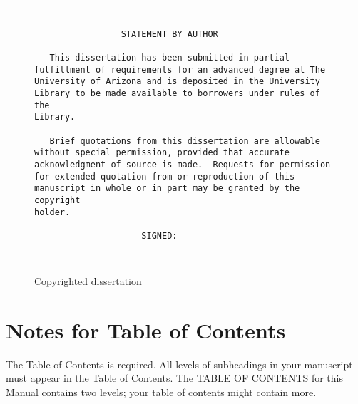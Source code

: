 \documentclass[draft]{ua-thesis}
\begin{document}
\begin{figure}
\hrule
\begin{verbatim}

                 STATEMENT BY AUTHOR

   This dissertation has been submitted in partial
fulfillment of requirements for an advanced degree at The
University of Arizona and is deposited in the University
Library to be made available to borrowers under rules of the
Library.

   Brief quotations from this dissertation are allowable
without special permission, provided that accurate
acknowledgment of source is made.  Requests for permission
for extended quotation from or reproduction of this
manuscript in whole or in part may be granted by the copyright
holder.

                     SIGNED: ________________________________

\end{verbatim}
\hrule
\caption{Copyrighted dissertation}\label{f5}
\end{figure}


\section{Notes for Table of Contents}

The Table of Contents is required. All levels of subheadings in your
manuscript must appear in the Table of Contents. The TABLE OF CONTENTS for
this Manual contains two levels; your table of contents might contain more.
\end{document}
